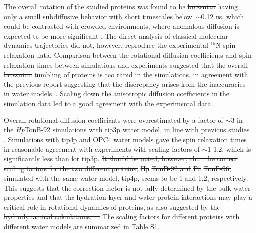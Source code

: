 \documentclass[journal=jpcbfk,manuscript=article]{achemso}
\providecommand{\DIFadd}[1]{{\protect\color{blue}\uwave{#1}}} %
\providecommand{\DIFdel}[1]{{\protect\color{red}\sout{#1}}}                      %
\providecommand{\DIFaddbegin}{} %
\providecommand{\DIFaddend}{} %
\providecommand{\DIFdelbegin}{} %
\providecommand{\DIFdelend}{} %
\begin{document}
The overall rotation of the studied proteins was found to be \DIFdelbegin \DIFdel{brownian }\DIFdelend \DIFaddbegin \DIFadd{Brownian }\DIFaddend having
only a small subdiffusive behavior with short timescales
below~$\sim$0.12 ns, which could be contrasted with crowded environments,
where anomalous diffusion is expected to be more significant \cite{hofling13}.
The direct analysis of classical molecular dynamics trajectories did not, however,
reproduce the experimental $^{15}$N spin relaxation data. Comparison between the rotational 
diffusion coefficients and spin relaxation times between simulations
and experiments suggested that
the overall \DIFdelbegin \DIFdel{brownian }\DIFdelend \DIFaddbegin \DIFadd{Brownian }\DIFaddend tumbling of proteins is too rapid in the simulations,
in agreement with the previous report suggesting that the discrepancy arises
from the inaccuracies in water models~\cite{wong08}.
Scaling down the anisotropic diffusion coefficients in the simulation data
led to a good agreement with the experimental data.
\DIFdelbegin %

\DIFdelend Overall rotational diffusion coefficients were overestimated by a factor of $\sim$3 in
the {\it Hp}TonB-92 simulations with tip3p water model, in line with previous
studies \cite{prompers02,wong08,anderson12}. Simulations with tip4p and OPC4
water models gave the spin relaxation times in reasonable agreement with experiments
with scaling factors of $\sim$1-1.2, which is significantly less than for tip3p.
\DIFdelbegin \DIFdel{It should be noted, however, that the correct scaling factors for 
the two different proteins, }%
\DIFdel{Hp}%
\DIFdel{TonB-92 and }%
\DIFdel{Pa}%
\DIFdel{TonB-96, simulated with the
same water model, tip4p, seems to be 1 and 1.2, respectively. This suggests
that the correction factor is not fully determined by the bulk water properties
and that the hydration layer and water-protein interactions may play a critical
role in rotational dynamics of proteins, as also suggested by the hydrodynamical 
calculations \mbox{%
\cite{torre00}}%
. }\DIFdelend %
The scaling factors for different proteins with
different water models are summarized in Table S1.
\end{document}
